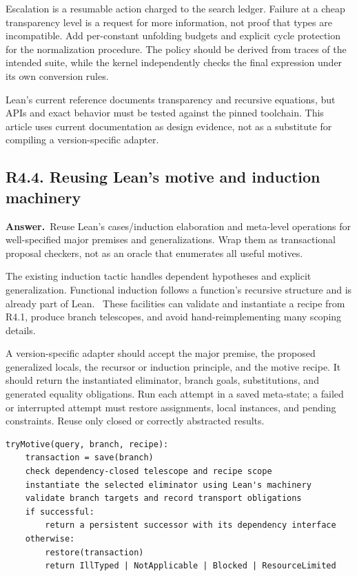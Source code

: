 \documentclass[11pt,a4paper]{article}
\newcommand{\qid}[3]{\subsection{#2. #3}\label{#1}}
\newcommand{\answer}{\noindent\textbf{Answer.}\ }
\theoremstyle{remark}
\begin{document}
Escalation is a resumable action charged to the search ledger. Failure at a cheap transparency level is a request for more information, not proof that types are incompatible. Add per-constant unfolding budgets and explicit cycle protection for the normalization procedure. The policy should be derived from traces of the intended suite, while the kernel independently checks the final expression under its own conversion rules.

Lean's current reference documents transparency and recursive equations, but APIs and exact behavior must be tested against the pinned toolchain. This article uses current documentation as design evidence, not as a substitute for compiling a version-specific adapter.~\cite{leanref,leanrec}

\qid{q44}{R4.4}{Reusing Lean's motive and induction machinery}
\answer Reuse Lean's cases/induction elaboration and meta-level operations for well-specified major premises and generalizations. Wrap them as transactional proposal checkers, not as an oracle that enumerates all useful motives.

The existing induction tactic handles dependent hypotheses and explicit generalization. Functional induction follows a function's recursive structure and is already part of Lean.~\cite{leanref,lean418} These facilities can validate and instantiate a recipe from R4.1, produce branch telescopes, and avoid hand-reimplementing many scoping details.

A version-specific adapter should accept the major premise, the proposed generalized locals, the recursor or induction principle, and the motive recipe. It should return the instantiated eliminator, branch goals, substitutions, and generated equality obligations. Run each attempt in a saved meta-state; a failed or interrupted attempt must restore assignments, local instances, and pending constraints. Reuse only closed or correctly abstracted results.

\begin{lstlisting}
tryMotive(query, branch, recipe):
    transaction = save(branch)
    check dependency-closed telescope and recipe scope
    instantiate the selected eliminator using Lean's machinery
    validate branch targets and record transport obligations
    if successful:
        return a persistent successor with its dependency interface
    otherwise:
        restore(transaction)
        return IllTyped | NotApplicable | Blocked | ResourceLimited
\end{lstlisting}
\end{document}

